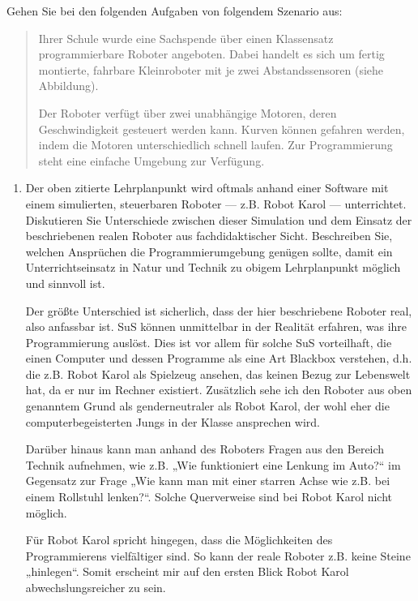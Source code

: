 \documentclass{lehramt-informatik-aufgabe}
\begin{document}

\noindent
Gehen Sie bei den folgenden Aufgaben von folgendem Szenario aus:

\begin{quote}
Ihrer Schule wurde eine Sachspende über einen Klassensatz
programmierbare Roboter angeboten. Dabei handelt es sich um fertig
montierte, fahrbare Kleinroboter mit je zwei Abstandssensoren (siehe
Abbildung).

Der Roboter verfügt über zwei unabhängige Motoren, deren Geschwindigkeit
gesteuert werden kann. Kurven können gefahren werden, indem die Motoren
unterschiedlich schnell laufen. Zur Programmierung steht eine einfache
Umgebung zur Verfügung.
\end{quote}

\begin{enumerate}


\item Der oben zitierte Lehrplanpunkt wird oftmals anhand einer Software
mit einem simulierten, steuerbaren Roboter — z.B. Robot Karol —
unterrichtet. Diskutieren Sie Unterschiede zwischen dieser Simulation
und dem Einsatz der beschriebenen realen Roboter aus fachdidaktischer
Sicht. Beschreiben Sie, welchen Ansprüchen die Programmierumgebung
genügen sollte, damit ein Unterrichtseinsatz in Natur und Technik zu
obigem Lehrplanpunkt möglich und sinnvoll ist.

\begin{liAntwort}
Der größte Unterschied ist sicherlich, dass der hier beschriebene
Roboter real, also anfassbar ist. SuS können unmittelbar in der Realität
erfahren, was ihre Programmierung auslöst. Dies ist vor allem für solche
SuS vorteilhaft, die einen Computer und dessen Programme als eine Art
Blackbox verstehen, d.h. die z.B. Robot Karol als Spielzeug ansehen, das
keinen Bezug zur Lebenswelt hat, da er nur im Rechner existiert.
Zusätzlich sehe ich den Roboter aus oben genanntem Grund als
genderneutraler als Robot Karol, der wohl eher die computerbegeisterten
Jungs in der Klasse ansprechen wird.

Darüber hinaus kann man anhand des Roboters Fragen aus den Bereich
Technik aufnehmen, wie z.B. „Wie funktioniert eine Lenkung im Auto?“ im
Gegensatz zur Frage „Wie kann man mit einer starren Achse wie z.B. bei
einem Rollstuhl lenken?“. Solche Querverweise sind bei Robot Karol nicht
möglich.

Für Robot Karol spricht hingegen, dass die Möglichkeiten des
Programmierens vielfältiger sind. So kann der reale Roboter z.B. keine
Steine „hinlegen“. Somit erscheint mir auf den ersten Blick Robot Karol
abwechslungsreicher zu sein.


\end{liAntwort}
\end{enumerate}
\end{document}
